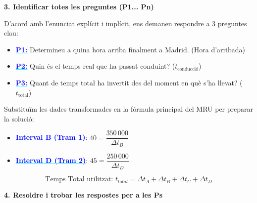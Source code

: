 \documentclass[12pt,a4paper]{article}
\begin{document}
{\begin{center}
\end{center}
}

\vspace{0.5cm}

{\color{black}\textbf{\large 3. Identificar totes les preguntes (P1... Pn)}}

{\color{blue}
D'acord amb l'enunciat explícit i implícit, ens demanen respondre a 3 preguntes clau:
\begin{itemize}
    \item \textcolor{cyan}{\underline{\textcolor{blue}{\textbf{P1:}}}} Determineu a quina hora arriba finalment a Madrid. (Hora d'arribada)
    \item \textcolor{cyan}{\underline{\textcolor{blue}{\textbf{P2:}}}} Quin és el temps real que ha passat conduint? ($t_{\text{conducció}}$)
    \item \textcolor{cyan}{\underline{\textcolor{blue}{\textbf{P3:}}}} Quant de temps total ha invertit des del moment en què s'ha llevat? ($t_{\text{total}}$)
\end{itemize}

Substituïm les dades transformades en la fórmula principal del MRU per preparar la solució:
\begin{itemize}
    \item \textcolor{cyan}{\underline{\textcolor{blue}{\textbf{Interval B (Tram 1)}}}}: $40 = \dfrac{350\,000}{\Delta t_B}$
    \item \textcolor{cyan}{\underline{\textcolor{blue}{\textbf{Interval D (Tram 2)}}}}: $45 = \dfrac{250\,000}{\Delta t_D}$
\end{itemize}

\begin{equation}
\text{Temps Total utilitzat: } t_{total} = \Delta t_A + \Delta t_B + \Delta t_C + \Delta t_D
\end{equation}
}

\vspace{0.5cm}

{\color{black}\textbf{\large 4. Resoldre i trobar les respostes per a les Ps}}
\end{document}

